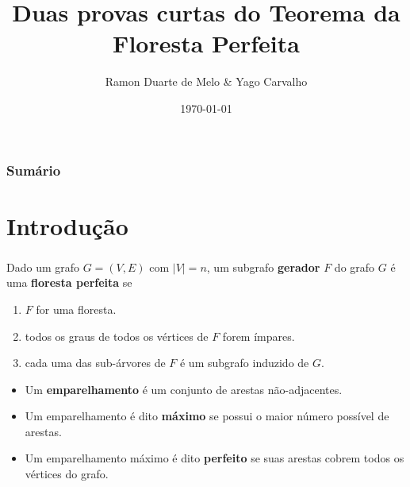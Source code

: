 \documentclass{beamer}
\title[Teorema da Floresta Perfeita]{Duas provas curtas do Teorema da Floresta Perfeita} %
\author{Ramon Duarte de Melo \& Yago Carvalho} %
\institute[UFRJ] %
{
    Universidade Federal do Rio de Janeiro \\ %
    \medskip
    \textit{ramonduarte@poli.ufrj.br \& } \\ %
    }
\date{\today} %
\begin{document}
\begin{frame} %
    \titlepage %
\end{frame}

\begin{frame} %
    \frametitle{Sumário} %
    \tableofcontents 
\end{frame}



\section{Introdução}


\begin{frame} %
    \frametitle{}

    \begin{corollary}
        Dado um grafo $G = (V, E)$ com $|V| = n$, um subgrafo \textbf{gerador} $F$ do grafo $G$ é uma \textbf{floresta perfeita} se
        \begin{enumerate}
            \item $F$ for uma floresta.
            \item todos os graus de todos os vértices de $F$ forem ímpares.
            \item cada uma das sub-árvores de $F$ é um subgrafo induzido de $G$.
        \end{enumerate}
    \end{corollary}

    \begin{definition}
        \begin{itemize}
            \item Um \textbf{emparelhamento} é um conjunto de arestas não-adjacentes.
            \item Um emparelhamento é dito \textbf{máximo} se possui o maior número possível de arestas.
            \item Um emparelhamento máximo é dito \textbf{perfeito} se suas arestas cobrem todos os vértices do grafo.
        \end{itemize}
        
    \end{definition}

\end{frame}
\end{document}
